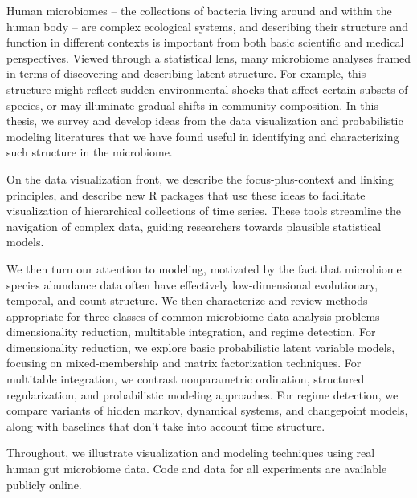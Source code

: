 
Human microbiomes -- the collections of bacteria living around and within the
human body -- are complex ecological systems, and describing their structure and
function in different contexts is important from both basic scientific and
medical perspectives. Viewed through a statistical lens, many microbiome
analyses framed in terms of discovering and describing latent structure. For
example, this structure might reflect sudden environmental shocks that affect
certain subsets of species, or may illuminate gradual shifts in community
composition. In this thesis, we survey and develop ideas from the data
visualization and probabilistic modeling literatures that we have found useful
in identifying and characterizing such structure in the microbiome.

On the data visualization front, we describe the focus-plus-context and linking
principles, and describe new R packages that use these ideas to facilitate
visualization of hierarchical collections of time series. These tools streamline
the navigation of complex data, guiding researchers towards plausible
statistical models.

We then turn our attention to modeling, motivated by the fact that microbiome
species abundance data often have effectively low-dimensional evolutionary,
temporal, and count structure. We then characterize and review methods
appropriate for three classes of common microbiome data analysis problems --
dimensionality reduction, multitable integration, and regime detection. For
dimensionality reduction, we explore basic probabilistic latent variable models,
focusing on mixed-membership and matrix factorization techniques. For multitable
integration, we contrast nonparametric ordination, structured regularization,
and probabilistic modeling approaches. For regime detection, we compare variants
of hidden markov, dynamical systems, and changepoint models, along with
baselines that don't take into account time structure.

Throughout, we illustrate visualization and modeling techniques using real human
gut microbiome data. Code and data for all experiments are available publicly
online.
